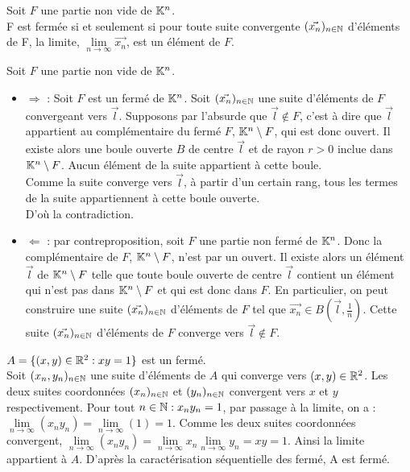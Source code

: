 \documentclass{book}
\begin{document}
\begin{Theoreme}
Soit $F$ une partie non vide de $\mathbb{K}^n$.\\
F est fermée si et seulement si pour toute suite convergente $(\vec{x_n})_{n\in\mathbb{N}}$
d'éléments de F, la limite, $\lim\limits_{n\to\infty}\vec{x_n}$,  est un élément de $F$.
\end{Theoreme}
\begin{Demonstration}
Soit $F$  une partie non vide de $\mathbb{K}^n$.\\
\begin{itemize}
\item $\Longrightarrow$ :   Soit $F$ est un fermé  de $\mathbb{K}^n$. Soit $(\vec{x_n})_{n\in\mathbb{N}}$ une suite d'éléments de $F$  convergeant vers $\vec{l}$.
Supposons par l'absurde que $\vec{l}\notin F$, c'est à dire que    $\vec{l}$ appartient au complémentaire du fermé $F$, $\mathbb{K}^n\setminus F$, qui est donc ouvert. Il existe alors une boule ouverte $B$ de centre $\vec{l}$  et de rayon $r > 0$ inclue dans $\mathbb{K}^n\setminus F$.  Aucun élément de la suite appartient à cette boule.\\ 
Comme la suite converge vers  $\vec{l}$, à partir d'un certain rang, tous les termes de la suite appartiennent à cette boule ouverte.\\
 D'où la contradiction. 
\item  $\Longleftarrow$ : par contreproposition, soit $F$ une partie non fermé de $\mathbb{K}^n$. Donc la complémentaire de $F$, $\mathbb{K}^n\setminus F$, n'est par un ouvert. Il existe alors un élément $\vec{l}$ de $\mathbb{K}^n\setminus F$ telle que toute boule ouverte de centre $\vec{l}$ contient un élément qui n'est pas dans $\mathbb{K}^n\setminus F$ et qui est donc dans $F$. En particulier, on peut construire une suite $(\vec{x_n})_{n\in\mathbb{N}}$ d'éléments de $F$  tel que $\vec{x_n}\in B(\vec{l},\frac 1 n )$. 
Cette suite $(\vec{x_n})_{n\in\mathbb{N}}$ d'éléments de $F$ converge vers $\vec{l}\notin F$.
\end{itemize}
\end{Demonstration}
\begin{Exemple}
$A=\{(x,y)\in \mathbb{R}^2:xy=1\}$ est un fermé.\\
Soit $(x_n,y_n)_{n\in\mathbb{N}}$ une suite d'éléments de $A$ qui converge vers $(x,y)\in \mathbb{R}^2$. Les deux suites coordonnées $(x_n)_{n\in\mathbb{N}}$ et $(y_n)_{n\in\mathbb{N}}$ convergent vers $x$ et $y$ respectivement. Pour tout $n \in \mathbb{N}: x_ny_n=1$, par passage à la limite, on a : $\lim\limits_{n\to\infty}(x_ny_n)=\lim\limits_{n\to\infty}(1)=1$. Comme les deux suites coordonnées convergent, 
 $\lim\limits_{n\to\infty}(x_ny_n)=\lim\limits_{n\to\infty}x_n\lim\limits_{n\to\infty}y_n=xy=1$. Ainsi la limite appartient à $A$.
D'après la caractérisation séquentielle des fermé, A est fermé.
\end{Exemple}
\end{document}
